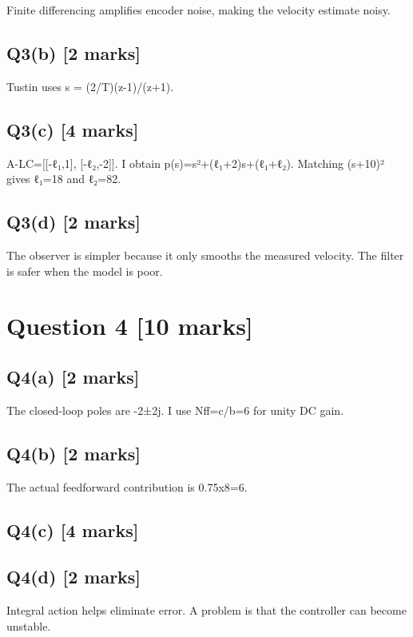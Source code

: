 \documentclass[11pt,a4paper]{article}
\begin{document}
Finite differencing amplifies encoder noise, making the velocity estimate noisy.

\subsection*{Q3(b) \hfill [2 marks]}

Tustin uses s = (2/T)(z-1)/(z+1).

\subsection*{Q3(c) \hfill [4 marks]}

A-LC=[[-ℓ₁,1], [-ℓ₂,-2]].
I obtain p(s)=s²+(ℓ₁+2)s+(ℓ₁+ℓ₂).
Matching (s+10)² gives ℓ₁=18 and ℓ₂=82.

\subsection*{Q3(d) \hfill [2 marks]}

The observer is simpler because it only smooths the measured velocity.
The filter is safer when the model is poor.

\section*{Question 4 \hfill [10 marks]}
\subsection*{Q4(a) \hfill [2 marks]}

The closed-loop poles are -2±2j.
I use Nff=c/b=6 for unity DC gain.

\subsection*{Q4(b) \hfill [2 marks]}

The actual feedforward contribution is 0.75x8=6.

\subsection*{Q4(c) \hfill [4 marks]}

\vspace{2mm}

\subsection*{Q4(d) \hfill [2 marks]}

Integral action helps eliminate error.
A problem is that the controller can become unstable.
\end{document}
